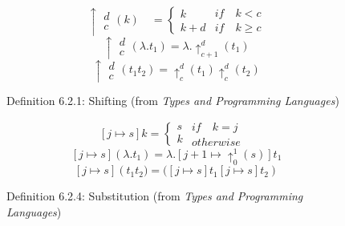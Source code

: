 \begin{figure}
\[\uparrow \begin{matrix} d \\ c \end{matrix}(k)\quad = \begin{cases} k \\ k+d \end{cases}\begin{matrix} if\quad k < c \\ if\quad k \ge c \end{matrix}\]
\[\uparrow \begin{matrix} d \\ c \end{matrix}(\lambda .{ t }_{ 1 }) = \lambda .{ \uparrow  }_{ c+1 }^{ d }({ t }_{ 1 })\]
\[\uparrow \begin{matrix} d \\ c \end{matrix}({ t }_{ 1 }{ t }_{ 2 }) = { \uparrow  }_{ c }^{ d }({ t }_{ 1 }) { \uparrow  }_{ c }^{ d }({ t }_{ 2 })\]
\caption{Definition 6.2.1: Shifting (from \textit{Types and Programming Languages})}
\label{fig:Pierce-shifting}
\end{figure}

\begin{figure}
\[[j\mapsto s]k=\begin{cases} s \\ k \end{cases}\begin{matrix} if\quad k=j\quad \\ otherwise \end{matrix}\]
\[[j\mapsto s](\lambda .{ t }_{ 1 })=\lambda .[j+1\mapsto { \uparrow  }_{ 0 }^{ 1 }(s)]{ t }_{ 1 }\]
\[[j\mapsto s]({ { t }_{ 1 }{ t }_{ 2 })=( }[j\mapsto s]{ t }_{ 1 }[j\mapsto s]{ t }_{ 2 })\]
\caption{Definition 6.2.4: Substitution (from \textit{Types and Programming Languages})}
\label{fig:Pierce-substitution}
\end{figure}

